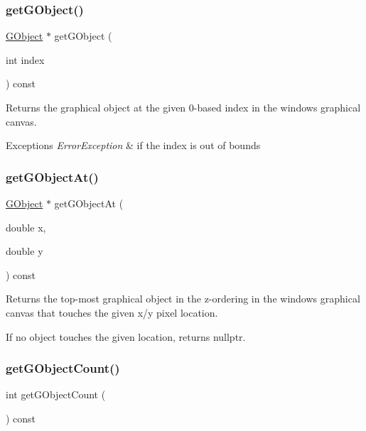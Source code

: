 \subsubsection{\texorpdfstring{get\+G\+Object()}{getGObject()}}
{\footnotesize\ttfamily \mbox{\hyperlink{classGObject}{G\+Object}} $\ast$ get\+G\+Object (\begin{DoxyParamCaption}\item[{int}]{index }\end{DoxyParamCaption}) const\hspace{0.3cm}{\ttfamily [virtual]}}



Returns the graphical object at the given 0-\/based index in the window\textquotesingle{}s graphical canvas. 


\begin{DoxyExceptions}{Exceptions}
{\em Error\+Exception} & if the index is out of bounds \\
\hline
\end{DoxyExceptions}
\mbox{\label{classGWindow_ab174a229ac7a3e9a4cd135d68dcf0076}} 
\subsubsection{\texorpdfstring{get\+G\+Object\+At()}{getGObjectAt()}}
{\footnotesize\ttfamily \mbox{\hyperlink{classGObject}{G\+Object}} $\ast$ get\+G\+Object\+At (\begin{DoxyParamCaption}\item[{double}]{x,  }\item[{double}]{y }\end{DoxyParamCaption}) const\hspace{0.3cm}{\ttfamily [virtual]}}



Returns the top-\/most graphical object in the z-\/ordering in the window\textquotesingle{}s graphical canvas that touches the given x/y pixel location. 

If no object touches the given location, returns nullptr. \mbox{\label{classGWindow_ad59694124f2cdd71af9c137094df4d1f}} 
\subsubsection{\texorpdfstring{get\+G\+Object\+Count()}{getGObjectCount()}}
{\footnotesize\ttfamily int get\+G\+Object\+Count (\begin{DoxyParamCaption}{ }\end{DoxyParamCaption}) const\hspace{0.3cm}{\ttfamily [virtual]}}



